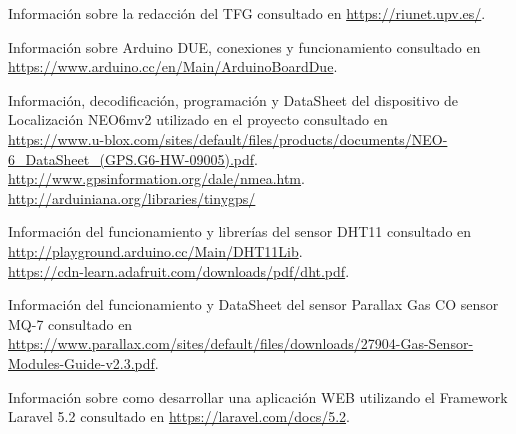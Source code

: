 \begin{thebibliography}{10}



Información sobre la redacción del TFG
\newblock consultado en 
\url{https://riunet.upv.es/}.

Información sobre Arduino DUE, conexiones y funcionamiento
\newblock consultado en 
\url{https://www.arduino.cc/en/Main/ArduinoBoardDue}.

Información, decodificación, programación y DataSheet del dispositivo de Localización NEO6mv2 utilizado en el proyecto
\newblock consultado en \\
\url{https://www.u-blox.com/sites/default/files/products/documents/NEO-6_DataSheet_(GPS.G6-HW-09005).pdf}.\\
\url{http://www.gpsinformation.org/dale/nmea.htm}.\\
\url{http://arduiniana.org/libraries/tinygps/}

Información del funcionamiento y librerías del sensor DHT11
\newblock consultado en 
\url{http://playground.arduino.cc/Main/DHT11Lib}.\\
\url{https://cdn-learn.adafruit.com/downloads/pdf/dht.pdf}.

Información del funcionamiento y DataSheet del sensor Parallax Gas CO sensor MQ-7
\newblock consultado en 
\url{https://www.parallax.com/sites/default/files/downloads/27904-Gas-Sensor-Modules-Guide-v2.3.pdf}.

Información sobre como desarrollar una aplicación WEB utilizando el Framework Laravel 5.2
\newblock consultado en 
\url{https://laravel.com/docs/5.2}.


\end{thebibliography}